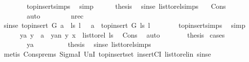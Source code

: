 \begin{isabellebody}
\ \ \ \ \ \ \isamarkupfalse%
\ top{\isacharunderscore}{\kern0pt}insert{\isachardot}{\kern0pt}simps\ \isamarkupfalse%
\ simp\isanewline
\ \ \ \ \isamarkupfalse%
\ {\isacharquery}{\kern0pt}thesis\ \isamarkupfalse%
\ sinse\ list{\isacharunderscore}{\kern0pt}to{\isacharunderscore}{\kern0pt}rel{\isachardot}{\kern0pt}simps\ \ \isamarkupfalse%
\ Cons\isanewline
\ \ \ \ \ \ \isamarkupfalse%
\ auto\isanewline
\ \ \isamarkupfalse%
\isanewline
\ \ \ \ \isamarkupfalse%
\ nrec\isanewline
\ \ \ \ \isamarkupfalse%
\ \isamarkupfalse%
\ sinse{\isacharcolon}{\kern0pt}\ {\isachardoublequoteopen}{\isacharparenleft}{\kern0pt}top{\isacharunderscore}{\kern0pt}insert\ G\ {\isacharparenleft}{\kern0pt}a\ {\isacharhash}{\kern0pt}\ ls{\isacharparenright}{\kern0pt}\ l{\isacharparenright}{\kern0pt}\ \ {\isacharequal}{\kern0pt}\ a\ {\isacharhash}{\kern0pt}\ top{\isacharunderscore}{\kern0pt}insert\ G\ ls\ l{\isachardoublequoteclose}\isanewline
\ \ \ \ \ \ \isamarkupfalse%
\ top{\isacharunderscore}{\kern0pt}insert{\isachardot}{\kern0pt}simps\ \isamarkupfalse%
\ simp\isanewline
\ \ \ \ \isamarkupfalse%
\ {\isacharparenleft}{\kern0pt}ya{\isacharparenright}{\kern0pt}\ {\isachardoublequoteopen}y\ {\isacharequal}{\kern0pt}\ a{\isachardoublequoteclose}\ {\isacharbar}{\kern0pt}\ {\isacharparenleft}{\kern0pt}yan{\isacharparenright}{\kern0pt}\ {\isachardoublequoteopen}{\isacharparenleft}{\kern0pt}y{\isacharcomma}{\kern0pt}\ x{\isacharparenright}{\kern0pt}\ {\isasymin}\ list{\isacharunderscore}{\kern0pt}to{\isacharunderscore}{\kern0pt}rel\ ls{\isachardoublequoteclose}\ \isamarkupfalse%
\ Cons\ \isamarkupfalse%
\ auto\isanewline
\ \ \ \ \isamarkupfalse%
\ \isamarkupfalse%
\ {\isacharquery}{\kern0pt}thesis\ \isamarkupfalse%
{\isacharparenleft}{\kern0pt}cases{\isacharparenright}{\kern0pt}\isanewline
\ \ \ \ \ \ \isamarkupfalse%
\ ya\isanewline
\ \ \ \ \ \ \isamarkupfalse%
\ \isamarkupfalse%
\ {\isacharquery}{\kern0pt}thesis\ \isamarkupfalse%
\ sinse\ list{\isacharunderscore}{\kern0pt}to{\isacharunderscore}{\kern0pt}rel{\isachardot}{\kern0pt}simps\isanewline
\ \ \ \ \ \ \ \ \isamarkupfalse%
\ {\isacharparenleft}{\kern0pt}metis\ Cons{\isachardot}{\kern0pt}prems\ SigmaI\ UnI{}\ top{\isacharunderscore}{\kern0pt}insert{\isacharunderscore}{\kern0pt}set\ insertCI\ list{\isacharunderscore}{\kern0pt}to{\isacharunderscore}{\kern0pt}rel{\isacharunderscore}{\kern0pt}in\ sinse{\isacharparenright}{\kern0pt}\ \isanewline

\end{isabellebody}
